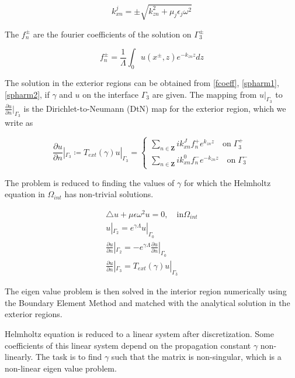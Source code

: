 \begin{equation} k_{xn}^j = \pm \sqrt{k_{zn}^2 + \mu_j \epsilon_j
\omega^2}
\end{equation}

The $f_n^\pm$ are the fourier coefficients of the solution on
$\Gamma_3^\pm$

\begin{equation}
f_n^\pm = \frac{1}{\Lambda}\int_0 u(x^\pm,z) e^{-k_{zn} z} dz
\label{fcoeff}
\end{equation}

The solution in the exterior regions can be obtained from
\ref{fcoeff}, \ref{spharm1}, \ref{spharm2}, if $\gamma$ and $u$ on the
interface $\Gamma_3$ are given. The mapping from $u|_{\Gamma_3}$ to
$\frac{\partial u}{\partial n} |_{\Gamma_3}$ is the
Dirichlet-to-Neumann (DtN) map for the exterior region, which we write
as

\begin{equation}
\frac{\partial u}{\partial n} |_{\Gamma_3} \coloneqq T_{ext}(\gamma)
u|_{\Gamma_3} = \left \{ \begin{array}{ll} \sum_{n \in \mathbf{Z}} i
k_{xn}^J f_n^+ e^{k_{zn}z} \quad \textrm{on} \; \Gamma_3^+ \\
\sum_{n \in \mathbf{Z}} ik_{xn}^0 f_n^- e^{-k_{zn}z} \quad
\textrm{on}\; \Gamma_3^- \end{array}\right .
\end{equation}

The problem is reduced to finding the values of $\gamma$ for which the
Helmholtz equation in $\Omega_{int}$ has non-trivial solutions.

\begin{equation}
\begin{array}{ll}
\triangle u + \mu \epsilon \omega^2 u = 0, \quad \textrm{in}
\Omega_{int} \\
u|_{\Gamma_2} = e^{\gamma \Lambda} u|_{\Gamma_0} \\
\frac{\partial u}{\partial n} |_{\Gamma_2} = -e^{\gamma \Lambda}
 \frac{\partial u}{\partial n} |_{\Gamma_0} \\
\frac{\partial u}{\partial n} |_{\Gamma_3} =  T_{ext}(\gamma) u|_{\Gamma_3}
\end{array}
\end{equation} 

 The eigen value problem is then solved in the interior region
numerically using the Boundary Element Method and matched with the
analytical solution in the exterior regions.

Helmholtz equation is reduced to a linear system after
discretization. Some coefficients of this linear system depend on the
propagation constant $\gamma$ non-linearly. The task is to find
$\gamma$ such that the matrix is non-singular, which is a non-linear
eigen value problem.

